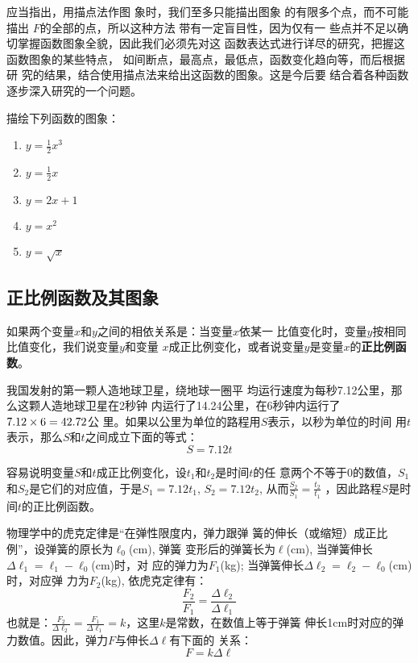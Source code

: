 应当指出，用描点法作图
象时，我们至多只能描出图象
的有限多个点，而不可能描出
$F$的全部的点，所以这种方法
带有一定盲目性，因为仅有一
些点并不足以确切掌握函数图象全貌，因此我们必须先对这
函数表达式进行详尽的研究，把握这函数图象的某些特点，
如间断点，最高点，最低点，函数变化趋向等，而后根据研
究的结果，结合使用描点法来给出这函数的图象。这是今后要
结合着各种函数逐步深入研究的一个问题。

\begin{ex}
描绘下列函数的图象：
\begin{multicols}{2}
\begin{enumerate}
    \item $y=\frac{1}{2}x^3$
    \item $y=\frac{1}{2}x$
    \item $y=2x+1$
    \item $y=x^2$
    \item $y=\sqrt{x}$
\end{enumerate}
\end{multicols}
\end{ex}

\subsection{正比例函数及其图象}
如果两个变量$x$和$y$之间的相依关系是：当变量$x$依某一
比值变化时，变量$y$按相同比值变化，我们说变量$y$和变量
$x$成正比例变化，或者说变量$y$是变量$x$的\textbf{正比例函数}。

\begin{example}
    我国发射的第一颗人造地球卫星，绕地球一圈平
均运行速度为每秒7.12公里，那么这颗人造地球卫星在2秒钟
内运行了14.24公里，在6秒钟内运行了$7.12\times6=42.72$公
里。如果以公里为单位的路程用$S$表示，以秒为单位的时间
用$t$表示，那么$S$和$t$之间成立下面的等式：
\[S=7.12t\]

容易说明变量$S$和$t$成正比例变化，设$t_1$和$t_2$是时间$t$的任
意两个不等于0的数值，$S_1$和$S_2$是它们的对应值，于是$S_1=
7.12t_1$, $S_2=7.12t_2$, 从而$\frac{S_2}{S_1}=\frac{t_2}{t_1}$
，因此路程$S$是时间$t$的正比例函数。
\end{example}

\begin{example}
    物理学中的虎克定律是“在弹性限度内，弹力跟弹
簧的伸长（或缩短）成正比例”，设弹簧的原长为$\ell_0$(cm), 弹簧
变形后的弹簧长为$\ell$(cm), 当弹簧伸长$\Delta \ell_1=\ell_1-\ell_0$(cm)时，对
应的弹力为$F_1$(kg); 当弹簧伸长$\Delta \ell_2=\ell_2-\ell_0$(cm)时，对应弹
力为$F_2$(kg), 依虎克定律有：
\[\frac{F_2}{F_1}=\frac{\Delta \ell_2}{\Delta \ell_1}\]
也就是：$\frac{F_2}{\Delta \ell_2}=\frac{F_1}{\Delta \ell_1}=k$，这里$k$是常数，在数值上等于弹簧
伸长1cm时对应的弹力数值。因此，弹力$F$与伸长$\Delta \ell$有下面的
关系：
\[F=k\Delta \ell\]
\end{example}

